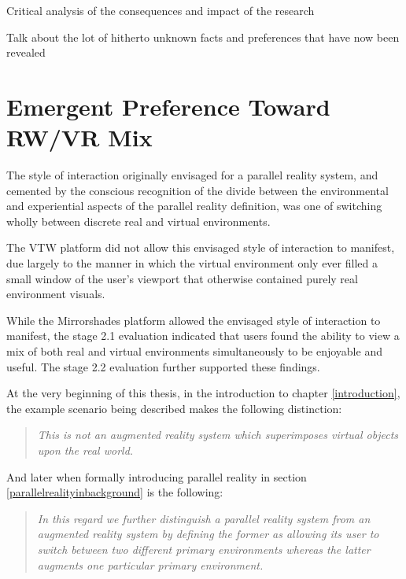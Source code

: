 Critical analysis of the consequences and impact of the research



Talk about the lot of hitherto unknown facts and preferences that have now been revealed




\section{Emergent Preference Toward RW/VR Mix}

The style of interaction originally envisaged for a parallel reality system, and cemented by the conscious recognition of the divide between the environmental and experiential aspects of the parallel reality definition, was one of switching wholly between discrete real and virtual environments.

The VTW platform did not allow this envisaged style of interaction to manifest, due largely to the manner in which the virtual environment only ever filled a small window of the user's viewport that otherwise contained purely real environment visuals.

While the Mirrorshades platform allowed the envisaged style of interaction to manifest, the stage 2.1 evaluation indicated that users found the ability to view a mix of both real and virtual environments simultaneously to be enjoyable and useful. The stage 2.2 evaluation further supported these findings.


At the very beginning of this thesis, in the introduction to chapter \ref{introduction}, the example scenario being described makes the following distinction:

\begin{quote}
	\textit{This is not an augmented reality system which superimposes virtual objects upon the real world.}
\end{quote}

And later when formally introducing parallel reality in section \ref{parallelrealityinbackground} is the following:

\begin{quote}
	\textit{In this regard we further distinguish a parallel reality system from an augmented reality system by defining the former as allowing its user to switch between two different primary environments whereas the latter augments one particular primary environment.}
\end{quote}

